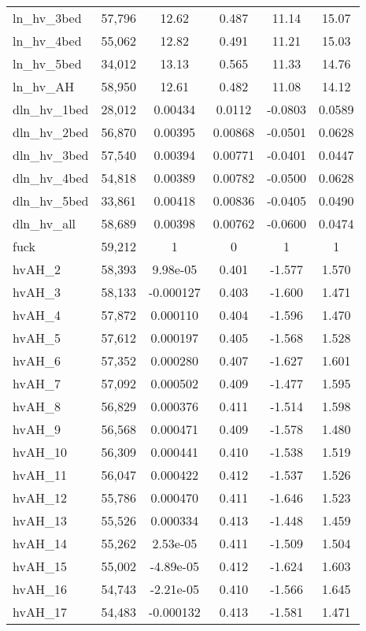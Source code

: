 \begin{tabular}{lccccc}
ln\_hv\_3bed & 57,796 & 12.62 & 0.487 & 11.14 & 15.07 \\
ln\_hv\_4bed & 55,062 & 12.82 & 0.491 & 11.21 & 15.03 \\
ln\_hv\_5bed & 34,012 & 13.13 & 0.565 & 11.33 & 14.76 \\
ln\_hv\_AH & 58,950 & 12.61 & 0.482 & 11.08 & 14.12 \\
dln\_hv\_1bed & 28,012 & 0.00434 & 0.0112 & -0.0803 & 0.0589 \\
dln\_hv\_2bed & 56,870 & 0.00395 & 0.00868 & -0.0501 & 0.0628 \\
dln\_hv\_3bed & 57,540 & 0.00394 & 0.00771 & -0.0401 & 0.0447 \\
dln\_hv\_4bed & 54,818 & 0.00389 & 0.00782 & -0.0500 & 0.0628 \\
dln\_hv\_5bed & 33,861 & 0.00418 & 0.00836 & -0.0405 & 0.0490 \\
dln\_hv\_all & 58,689 & 0.00398 & 0.00762 & -0.0600 & 0.0474 \\
fuck & 59,212 & 1 & 0 & 1 & 1 \\
hvAH\_2 & 58,393 & 9.98e-05 & 0.401 & -1.577 & 1.570 \\
hvAH\_3 & 58,133 & -0.000127 & 0.403 & -1.600 & 1.471 \\
hvAH\_4 & 57,872 & 0.000110 & 0.404 & -1.596 & 1.470 \\
hvAH\_5 & 57,612 & 0.000197 & 0.405 & -1.568 & 1.528 \\
hvAH\_6 & 57,352 & 0.000280 & 0.407 & -1.627 & 1.601 \\
hvAH\_7 & 57,092 & 0.000502 & 0.409 & -1.477 & 1.595 \\
hvAH\_8 & 56,829 & 0.000376 & 0.411 & -1.514 & 1.598 \\
hvAH\_9 & 56,568 & 0.000471 & 0.409 & -1.578 & 1.480 \\
hvAH\_10 & 56,309 & 0.000441 & 0.410 & -1.538 & 1.519 \\
hvAH\_11 & 56,047 & 0.000422 & 0.412 & -1.537 & 1.526 \\
hvAH\_12 & 55,786 & 0.000470 & 0.411 & -1.646 & 1.523 \\
hvAH\_13 & 55,526 & 0.000334 & 0.413 & -1.448 & 1.459 \\
hvAH\_14 & 55,262 & 2.53e-05 & 0.411 & -1.509 & 1.504 \\
hvAH\_15 & 55,002 & -4.89e-05 & 0.412 & -1.624 & 1.603 \\
hvAH\_16 & 54,743 & -2.21e-05 & 0.410 & -1.566 & 1.645 \\
hvAH\_17 & 54,483 & -0.000132 & 0.413 & -1.581 & 1.471 \\

\end{tabular}
